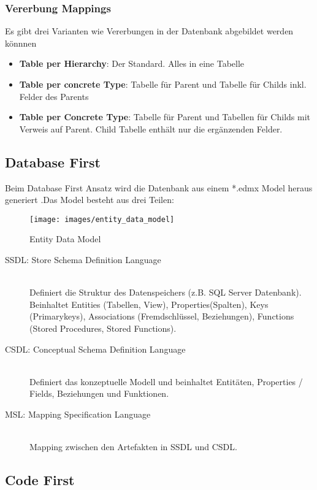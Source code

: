 \subsubsection{Vererbung Mappings}
Es gibt drei Varianten wie Vererbungen in der Datenbank abgebildet werden könnnen
\begin{itemize}
	\item \textbf{Table per Hierarchy}: Der Standard. Alles in eine Tabelle
	\item \textbf{Table per concrete Type}: Tabelle für Parent und Tabelle für Childs inkl. Felder des Parents
	\item \textbf{Table per Concrete Type}: Tabelle für Parent und Tabellen für Childs mit Verweis auf Parent. Child Tabelle enthält nur die ergänzenden Felder.
\end{itemize}

\subsection{Database First}
Beim Database First Ansatz wird die Datenbank aus einem *.edmx Model heraus generiert .Das Model besteht aus drei Teilen:
\begin{figure}[h]
	\centering
	\texttt{[image: images/entity\_data\_model]}
	\caption{Entity Data Model}
	\label{fig:entitydatamodel}
\end{figure}
\begin{description}
	\item[SSDL: Store Schema Definition Language] \hfill \\
	Definiert die Struktur des Datenspeichers (z.B. SQL Server Datenbank). Beinhaltet Entities (Tabellen, View), Properties(Spalten), Keys (Primarykeys), Associations (Fremdschlüssel, Beziehungen), Functions (Stored Procedures, Stored Functions). 
	\item[CSDL: Conceptual Schema Definition Language] \hfill \\
	Definiert das konzeptuelle Modell und beinhaltet Entitäten, Properties / Fields, Beziehungen und Funktionen. 
	\item[MSL: Mapping Specification Language] \hfill \\ 
	Mapping zwischen den Artefakten in SSDL und CSDL.  
\end{description}

\subsection{Code First}
